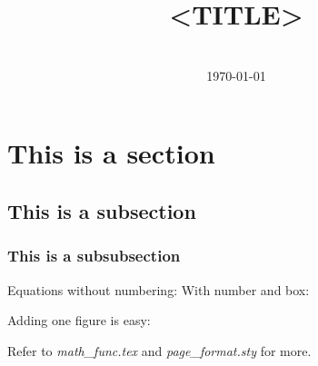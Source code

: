 \documentclass[12pt, a4paper]{article}
\title{<TITLE>} %
\author{\JL} %
\date{\US \\ \today} %
\begin{document}
\maketitlepage

\section{This is a section}
\subsection{This is a subsection}
\subsubsection{This is a subsubsection}
Equations without numbering:
With number and box:



Adding one figure is easy:

Refer to \textit{math\_func.tex} and \textit{page\_format.sty} for more.


\blankpage

\end{document}
